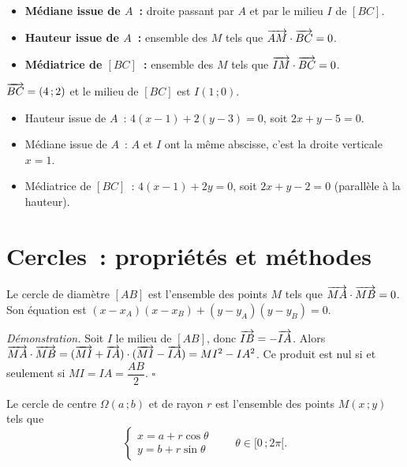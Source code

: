 \begin{methode}
\begin{itemize}
  \item \textbf{M\'ediane issue de $A$~:} droite passant par $A$ et par le milieu $I$ de $[BC]$.
  \item \textbf{Hauteur issue de $A$~:} ensemble des $M$ tels que $\overrightarrow{AM}\cdot\overrightarrow{BC}=0$.
  \item \textbf{M\'ediatrice de $[BC]$~:} ensemble des $M$ tels que $\overrightarrow{IM}\cdot\overrightarrow{BC}=0$.
\end{itemize}
\end{methode}

\begin{ex}[Triangle $A(1\,;3)$, $B(-1\,;-1)$, $C(3\,;1)$]
$\overrightarrow{BC}=(4\,;2)$ et le milieu de $[BC]$ est $I(1\,;0)$.
\begin{itemize}
  \item Hauteur issue de $A$~: $4(x-1)+2(y-3)=0$, soit $2x+y-5=0$.
  \item M\'ediane issue de $A$~: $A$ et $I$ ont la m\^eme abscisse, c'est la droite verticale $x=1$.
  \item M\'ediatrice de $[BC]$~: $4(x-1)+2y=0$, soit $2x+y-2=0$ (parall\`ele \`a la hauteur).
\end{itemize}
\end{ex}

\section{Cercles~: propri\'et\'es et m\'ethodes}

\begin{prop}
Le cercle de diam\`etre $[AB]$ est l'ensemble des points $M$ tels que
$\overrightarrow{MA}\cdot\overrightarrow{MB}=0$. Son \'equation est
$(x-x_A)(x-x_B)+(y-y_A)(y-y_B)=0$.
\end{prop}

\noindent\textit{D\'emonstration.} Soit $I$ le milieu de $[AB]$, donc $\overrightarrow{IB}=-\overrightarrow{IA}$.
Alors $\overrightarrow{MA}\cdot\overrightarrow{MB}=(\overrightarrow{MI}+\overrightarrow{IA})\cdot(\overrightarrow{MI}-\overrightarrow{IA})=MI^2-IA^2$.
Ce produit est nul si et seulement si $MI=IA=\dfrac{AB}{2}$. \hfill$\square$

\begin{prop}
Le cercle de centre $\Omega(a\,;b)$ et de rayon $r$ est l'ensemble des points
$M(x\,;y)$ tels que
$$\begin{cases}x=a+r\cos\theta\\ y=b+r\sin\theta\end{cases}\qquad\theta\in[0\,;2\pi[.$$
\end{prop}

